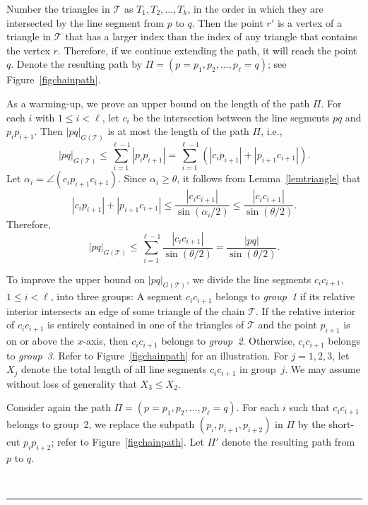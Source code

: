 \documentclass[12pt]{article}
\newcommand{\qed}{\rule{0.5em}{1.5ex}}
\newcommand{\fqed}{{\hfill~\qed}}
\newenvironment{proof}{{\noindent \bf Proof.}}
                      {{\hfill \fqed} \vspace{1em}}
\begin{document}
\begin{proof}
Number the triangles in $\mathcal{T}$ as $T_1,T_2,\ldots,T_k$, in the 
order in which they are intersected by the line segment from $p$ to 
$q$. Then the point $r'$ is a vertex of a triangle in $\mathcal{T}$ 
that has a larger index than the index of any triangle that contains 
the vertex $r$. Therefore, if we continue extending the path, it will 
reach the point $q$. Denote the resulting path by 
$\Pi = (p=p_1,p_2,\ldots,p_{\ell}=q)$; see Figure~\ref{figchainpath}. 

As a warming-up, we prove an upper bound on the length of the path $\Pi$.
For each $i$ with $1 \leq i < \ell$, let $c_i$ be the intersection 
between the line segments $pq$ and $p_i p_{i+1}$. Then 
$|pq|_{G(\mathcal{T})}$ is at most the length of the path $\Pi$, i.e., 
\[ |pq|_{G(\mathcal{T})} \leq 
     \sum_{i=1}^{\ell-1} |p_i p_{i+1}| =  
     \sum_{i=1}^{\ell-1} \left( |c_i p_{i+1}| + |p_{i+1} c_{i+1}| 
                         \right) .
\]  
Let $\alpha_i = \angle(c_i p_{i+1} c_{i+1})$. Since 
$\alpha_i \geq \theta$, it follows from Lemma~\ref{lemtriangle} that 
\[ |c_i p_{i+1}| + |p_{i+1} c_{i+1}| \leq 
         \frac{|c_i c_{i+1}|}{\sin (\alpha_i/2)} \leq  
         \frac{|c_i c_{i+1}|}{\sin (\theta/2)} .
\]  
Therefore, 
\[ |pq|_{G(\mathcal{T})} \leq 
     \sum_{i=1}^{\ell-1} \frac{|c_i c_{i+1}|}{\sin (\theta/2)} =  
     \frac{|pq|}{\sin (\theta/2)} . 
\]   

To improve the upper bound on $|pq|_{G(\mathcal{T})}$, we divide the 
line segments $c_i c_{i+1}$, $1 \leq i < \ell$, into three groups: A 
segment $c_i c_{i+1}$ belongs to \emph{group~1} if its 
relative interior intersects an edge of some triangle of the chain 
$\mathcal{T}$. If the relative interior of $c_i c_{i+1}$ is entirely 
contained in one of the triangles of $\mathcal{T}$ and the point 
$p_{i+1}$ is on or above the $x$-axis, then $c_i c_{i+1}$ belongs to 
\emph{group~2}. Otherwise, $c_i c_{i+1}$ belongs to \emph{group~3}.  
Refer to Figure~\ref{figchainpath} for an illustration.  
For $j=1,2,3$, let $X_j$ denote the total length of all line segments 
$c_i c_{i+1}$ in group~$j$. We may assume without loss of generality 
that $X_3 \leq X_2$. 

Consider again the path $\Pi = (p=p_1,p_2,\ldots,p_{\ell}=q)$. 
For each $i$ such that $c_i c_{i+1}$ belongs to group~2, we replace 
the subpath $(p_i,p_{i+1},p_{i+2})$ in $\Pi$ by the short-cut 
$p_i p_{i+2}$; refer to Figure~\ref{figchainpath}. Let $\Pi'$ denote 
the resulting path from $p$ to $q$. 


\end{proof}
\end{document}
